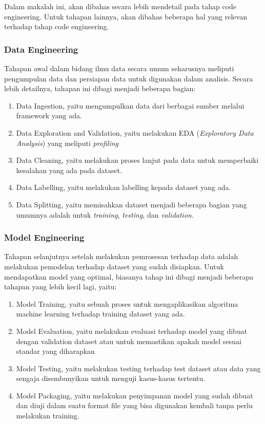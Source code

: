 Dalam makalah ini, akan dibahas secara lebih mendetail pada tahap code engineering.
Untuk tahapan lainnya, akan dibahas beberapa hal yang relevan terhadap tahap code engineering.

\subsubsection{Data Engineering}

Tahapan awal dalam bidang ilmu data secara umum seharusnya meliputi pengumpulan data dan persiapan data untuk digunakan dalam analisis.
Secara lebih detailnya, tahapan ini dibagi menjadi beberapa bagian:
\begin{enumerate}
  \item Data Ingestion, yaitu mengumpulkan data dari berbagai sumber melalui framework yang ada. 
  \item Data Exploration and Validation, yaitu melakukan EDA (\textit{Exploratory Data Analysis}) yang meliputi \textit{profiling}
  \item Data Cleaning, yaitu melakukan proses lanjut pada data untuk memperbaiki kesalahan yang ada pada dataset.
  \item Data Labelling, yaitu melakukan labelling kepada dataset yang ada.
  \item Data Splitting, yaitu memisahkan dataset menjadi beberapa bagian yang umumnya adalah untuk \textit{training}, \textit{testing}, dan \textit{validation}.
\end{enumerate}

\subsubsection{Model Engineering}

Tahapan selanjutnya setelah melakukan pemrosesan terhadap data adalah melakukan pemodelan terhadap dataset yang sudah disiapkan.
Untuk mendapatkan model yang optimal, biasanya tahap ini dibagi menjadi beberapa tahapan yang lebih kecil lagi, yaitu:
\begin{enumerate}
  \item Model Training, yaitu sebuah proses untuk mengaplikasikan algoritma machine learning terhadap training dataset yang ada.
  \item Model Evaluation, yaitu melakukan evaluasi terhadap model yang dibuat dengan validation dataset atau untuk memastikan apakah model sesuai standar yang diharapkan
  \item Model Testing, yaitu melakukan testing terhadap test dataset atau data yang sengaja disembunyikan untuk menguji kasus-kasus tertentu.
  \item Model Packaging, yaitu melakukan penyimpanan model yang sudah dibuat dan diuji dalam suatu format file yang bisa digunakan kembali tanpa perlu melakukan training.
\end{enumerate}

